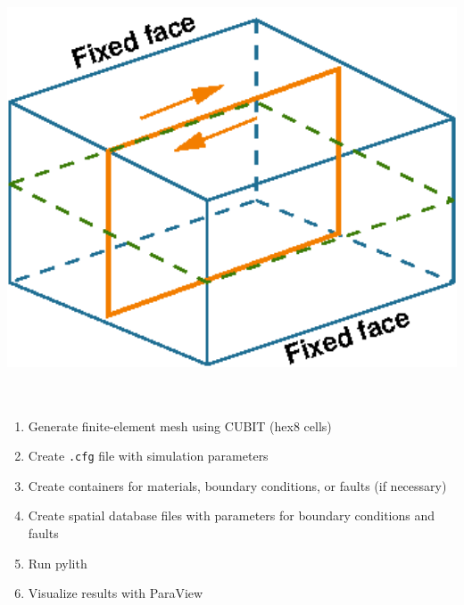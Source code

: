 \documentclass[pdftex,cig,slideColor]{pp4slides}
\begin{document}

  \vfill
  \begin{center}
    \includegraphics[height=5.0in]{figs/examplehex8}
  \end{center}

  \summary{}

  \begin{enumerate}
  \item Generate finite-element mesh using CUBIT (hex8 cells)
  \item Create {\tt .cfg} file with simulation parameters
  \item Create containers for materials, boundary conditions, or
    faults (if necessary)
  \item Create spatial database files with parameters for boundary
    conditions and faults
  \item Run pylith
  \item Visualize results with ParaView
  \end{enumerate}

  \summary{}
\end{document}
